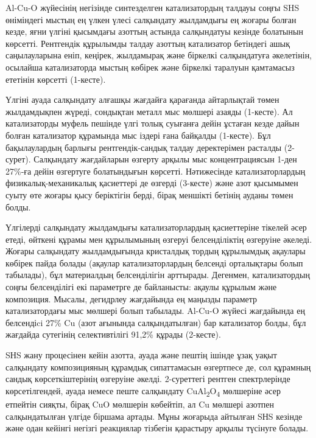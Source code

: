\begin{multicols}{2}
Al-Cu-O жүйесінің негізінде синтезделген катализатордың талдауы соңғы
SHS өніміндегі мыстың ең үлкен үлесі салқындату жылдамдығы ең жоғары
болған кезде, яғни үлгіні қысымдағы азоттың астында салқындатуы кезінде
болатынын көрсетті. Рентгендік құрылымды талдау азоттың катализатор
бетіндегі ашық саңылауларына еніп, кеңірек, жылдамырақ және біркелкі
салқындатуға әкелетінін, осылайша катализаторда мыстың көбірек және
біркелкі таралуын қамтамасыз ететінін көрсетті (1-кесте).

Үлгіні ауада салқындату алғашқы жағдайға қарағанда айтарлықтай төмен
жылдамдықпен жүреді, сондықтан металл мыс мөлшері азаяды (1-кесте). Ал
катализаторды муфель пешінде үлгі толық суығанға дейін ұстаған кезде
дайын болған катализатор құрамында мыс іздері ғана байқалды (1-кесте).
Бұл бақылаулардың барлығы рентгендік-сандық талдау деректерімен расталды
(2-сурет). Салқындату жағдайларын өзгерту арқылы мыс концентрациясын
1-ден 27\%-ға дейін өзгертуге болатындығын көрсетті. Нәтижесінде
катализаторлардың физикалық-механикалық қасиеттері де өзгерді (3-кесте)
және азот қысымымен суыту өте жоғары қысу беріктігін берді, бірақ
меншікті бетінің ауданы төмен болды.

Үлгілерді салқындату жылдамдығы катализаторлардың қасиеттеріне тікелей
әсер етеді, өйткені құрамы мен құрылымының өзгеруі белсенділіктің
өзгеруіне әкеледі. Жоғары салқындату жылдамдығында кристалдық тордың
құрылымдық ақаулары көбірек пайда болады (ақаулар катализаторлардың
белсенді орталықтары болып табылады), бұл материалдың белсенділігін
арттырады. Дегенмен, катализатордың соңғы белсенділігі екі параметрге де
байланысты: ақаулы құрылым және композиция. Мысалы, дегидрлеу жағдайында
ең маңызды параметр катализатордағы мыс мөлшері болып табылады. Al-Cu-O
жүйесі жағдайында ең белсендіci 27\% Cu (азот ағынында салқындатылған)
бар катализатор болды, бұл жағдайда сутегінің селективтілігі 91,2\%
құрады (2-кесте).

SНS жану процесінен кейін азотта, ауада және пештің ішінде ұзақ уақыт
салқындату композицияның құрамдық сипаттамасын өзгертпесе де, сол
құрамның сандық көрсеткіштерінің өзгеруіне әкелді. 2-суреттегі рентген
спектрлерінде көрсетілгендей, ауада немесе пеште салқындату
CuAl\textsubscript{2}O\textsubscript{4} мөлшеріне әсер етпейтін сияқты,
бірақ CuO мөлшерін көбейтіп, ал Cu мөлшері азотпен салқындатылған үлгіде
біршама артады. Мұны жоғарыда айтылған SНS кезінде және одан кейінгі
негізгі реакциялар тізбегін қарастыру арқылы түсінуге болады.
\end{multicols}

